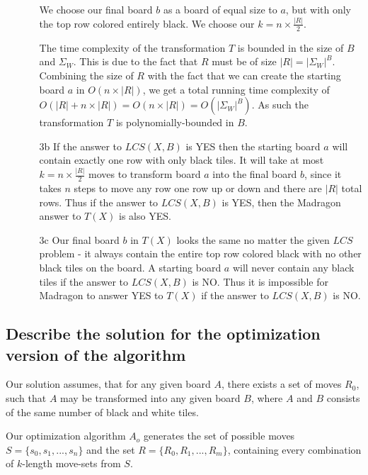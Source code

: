 \documentclass[12pt]{article}
\begin{document}
\begin{enumerate}
\begin{enumerate}
        We choose our final board $b$ as a board of equal size to $a$, but with only the top row colored entirely black. We choose our $k = n\times\frac{|R|}{2}$.

        The time complexity of the transformation $T$ is bounded in the size of $B$ and $\Sigma_W$. This is due to the fact that $R$ must be of size $|R| = |\Sigma_W|^B$. Combining the size of $R$ with the fact that we can create the starting board $a$ in $O(n \times |R|)$, we get a total running time complexity of $O(|R|+n \times |R|) = O(n \times |R|) = O(|\Sigma_W|^B)$. As such the transformation $T$ is polynomially-bounded in $B$.

        \item[3b]
        If the answer to $LCS(X, B)$ is YES then the starting board $a$ will contain exactly one row with only black tiles. It will take at most $k = n\times\frac{|R|}{2}$ moves to transform board $a$ into the final board $b$, since it takes $n$ steps to move any row one row up or down and there are $|R|$ total rows. Thus if the answer to $LCS(X, B)$ is YES, then the Madragon answer to $T(X)$ is also YES.

        \item[3c]
        Our final board $b$ in $T(X)$ looks the same no matter the given $LCS$ problem - it always contain the entire top row colored black with no other black tiles on the board. A starting board $a$ will never contain any black tiles if the answer to $LCS(X, B)$ is NO. Thus it is impossible for Madragon to answer YES to $T(X)$ if the answer to $LCS(X, B)$ is NO.

    \end{enumerate}

\end{enumerate}

\subsection{Describe the solution for the optimization version of the algorithm}
\label{sub:Describe the solution for the optimization version of the algorithm}

Our solution assumes, that for any given board $A$, there exists a set of moves $R_0$, such that $A$ may be transformed into any given board $B$, where $A$ and $B$ consists of the same number of black and white tiles.

Our optimization algorithm $A_o$ generates the set of possible moves $S = \{s_0, s_1, ...,s_n\}$ and the set $R = \{R_0, R_1, ..., R_m\}$, containing every combination of $k$-length move-sets from $S$.
\end{document}
